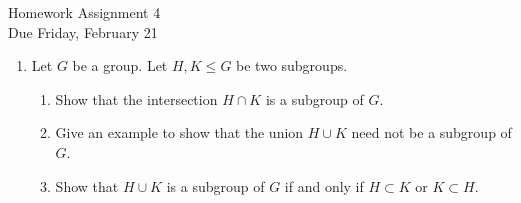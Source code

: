 \documentclass[11pt]{article}
\begin{document}
\begin{center}
\Large {Homework Assignment 4}\\
\small {Due Friday, February 21}
\end{center}
\begin{enumerate}
	\item Let $G$ be a group.  Let $H,K\le G$ be two subgroups.
  \begin{enumerate}
    \item Show that the intersection $H\cap K$ is a subgroup of $G$.
    \item Give an example to show that the union $H\cup K$ need not be a subgroup of $G$.
    \item Show that $H\cup K$ is a subgroup of $G$ if and only if $H\subset K$ or $K\subset H$.
  \end{enumerate}


\end{enumerate}
\end{document}

